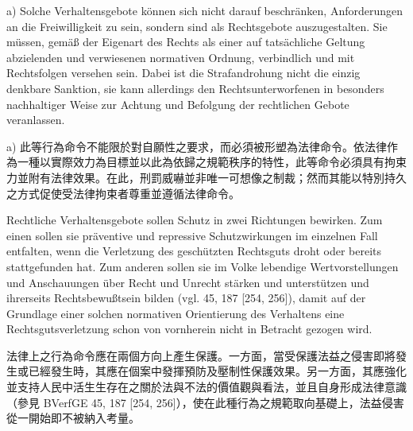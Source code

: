 \documentclass[12pt]{article}
\begin{document}
\begin{sourcepara}[title={原文D.42}]
a) Solche Verhaltensgebote können sich nicht darauf beschränken, Anforderungen an die Freiwilligkeit zu sein, sondern sind als Rechtsgebote auszugestalten. Sie müssen, gemäß der Eigenart des Rechts als einer auf tatsächliche Geltung abzielenden und verwiesenen normativen Ordnung, verbindlich und mit Rechtsfolgen versehen sein. Dabei ist die Strafandrohung nicht die einzig denkbare Sanktion, sie kann allerdings den Rechtsunterworfenen in besonders nachhaltiger Weise zur Achtung und Befolgung der rechtlichen Gebote veranlassen.
\end{sourcepara}
\begin{transpara}
a) 此等行為命令不能限於對自願性之要求，而必須被形塑為法律命令。依法律作為一種以實際效力為目標並以此為依歸之規範秩序的特性，此等命令必須具有拘束力並附有法律效果。在此，刑罰威嚇並非唯一可想像之制裁；然而其能以特別持久之方式促使受法律拘束者尊重並遵循法律命令。
\end{transpara}

\begin{sourcepara}[title={原文D.43}]
Rechtliche Verhaltensgebote sollen Schutz in zwei Richtungen bewirken. Zum einen sollen sie präventive und repressive Schutzwirkungen im einzelnen Fall entfalten, wenn die Verletzung des geschützten Rechtsguts droht oder bereits stattgefunden hat. Zum anderen sollen sie im Volke lebendige Wertvorstellungen und Anschauungen über Recht und Unrecht stärken und unterstützen und ihrerseits Rechtsbewußtsein bilden (vgl. \abbrBVerfGE{} 45, 187 [254, 256]), damit auf der Grundlage einer solchen normativen Orientierung des Verhaltens eine Rechtsgutsverletzung schon von vornherein nicht in Betracht gezogen wird.
\end{sourcepara}
\begin{transpara}
法律上之行為命令應在兩個方向上產生保護。一方面，當受保護法益之侵害即將發生或已經發生時，其應在個案中發揮預防及壓制性保護效果。另一方面，其應強化並支持人民中活生生存在之關於法與不法的價值觀與看法，並且自身形成法律意識（參見 BVerfGE 45, 187 [254, 256]），使在此種行為之規範取向基礎上，法益侵害從一開始即不被納入考量。
\end{transpara}
\end{document}
